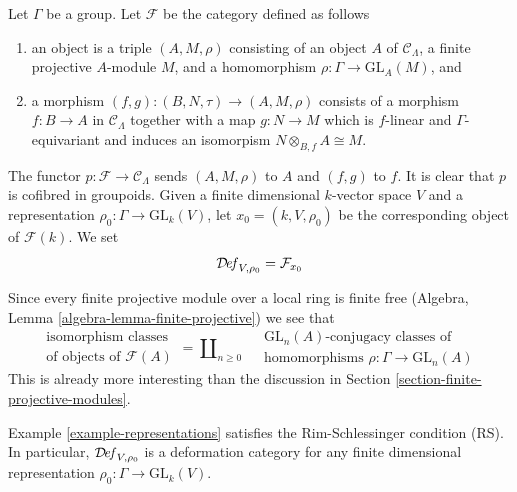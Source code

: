 \begin{example}
\label{example-representations}
Let $\Gamma$ be a group.
Let $\mathcal{F}$ be the category defined as follows
\begin{enumerate}
\item an object is a triple $(A, M, \rho)$ consisting of an
object $A$ of $\mathcal{C}_\Lambda$, a finite projective $A$-module $M$,
and a homomorphism $\rho : \Gamma \to \text{GL}_A(M)$, and
\item a morphism $(f, g) : (B, N, \tau) \to (A, M, \rho)$ consists of
a morphism $f : B \to A$ in $\mathcal{C}_\Lambda$ together
with a map $g : N \to M$ which is $f$-linear and $\Gamma$-equivariant
and induces an isomorpism $N \otimes_{B, f} A \cong M$.
\end{enumerate}
The functor $p : \mathcal{F} \to \mathcal{C}_\Lambda$ sends $(A, M, \rho)$
to $A$ and $(f, g)$ to $f$. It is clear that $p$ is cofibred in groupoids.
Given a finite dimensional $k$-vector space $V$ and a representation
$\rho_0 : \Gamma \to \text{GL}_k(V)$,
let $x_0 = (k, V, \rho_0)$ be the corresponding object of $\mathcal{F}(k)$.
We set
$$
\mathcal{D}\!\mathit{ef}_{V, \rho_0} = \mathcal{F}_{x_0}
$$
\end{example}

\noindent
Since every finite projective module over a local ring is finite free
(Algebra, Lemma \ref{algebra-lemma-finite-projective})
we see that
$$
\begin{matrix}
\text{isomorphism classes} \\
\text{of objects of }\mathcal{F}(A)
\end{matrix}
=
\coprod\nolimits_{n \geq 0}\quad
\begin{matrix}
\text{GL}_n(A)\text{-conjugacy classes of}\\
\text{homomorphisms }\rho : \Gamma \to \text{GL}_n(A)
\end{matrix}
$$
This is already more interesting than the discussion in
Section \ref{section-finite-projective-modules}.

\begin{lemma}
\label{lemma-representations-RS}
Example \ref{example-representations}
satisfies the Rim-Schlessinger condition (RS).
In particular, $\mathcal{D}\!\mathit{ef}_{V, \rho_0}$ is a deformation category
for any finite dimensional representation
$\rho_0 : \Gamma \to \text{GL}_k(V)$.
\end{lemma}

